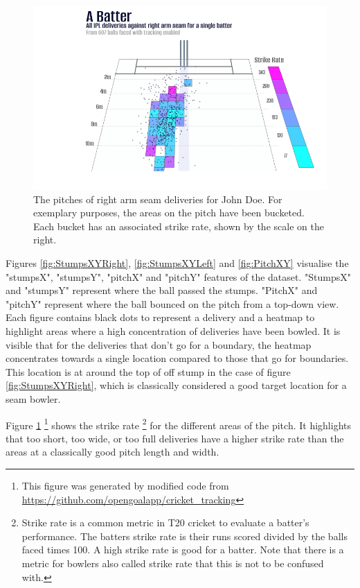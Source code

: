 \documentclass[12pt,a4paper]{report}
\theoremstyle{definition}
\begin{document}
\begin{figure}
    \centering
    \includegraphics[width=\linewidth]{right_arm_seam_pitch_strike_rate.png}
    \caption{The pitches of right arm seam deliveries for John Doe. For exemplary purposes, the areas on the pitch have been bucketed. Each bucket has an associated strike rate, shown by the scale on the right.}
    \label{fig:PitchXYStrikeRate}
\end{figure}

Figures \ref{fig:StumpsXYRight}, \ref{fig:StumpsXYLeft} and \ref{fig:PitchXY} visualise the "stumpsX", "stumpsY", "pitchX" and "pitchY" features of the dataset. 
"StumpsX" and "stumpsY" represent where the ball passed the stumps.
"PitchX" and "pitchY" represent where the ball bounced on the pitch from a top-down view.
Each figure contains black dots to represent a delivery and a heatmap to highlight areas where a high concentration of deliveries have been bowled.
It is visible that for the deliveries that don't go for a boundary, the heatmap concentrates towards a single location compared to those that go for boundaries.
This location is at around the top of off stump in the case of figure \ref{fig:StumpsXYRight}, which is classically considered a good target location for a seam bowler.

Figure \ref{fig:PitchXYStrikeRate} \footnote{This figure was generated by modified code from \url{https://github.com/opengoalapp/cricket\_tracking}} shows the strike rate \footnote{Strike rate is a common metric in T20 cricket to evaluate a batter's performance. The batters strike rate is their runs scored divided by the balls faced times 100. A high strike rate is good for a batter. Note that there is a metric for bowlers also called strike rate that this is not to be confused with.} for the different areas of the pitch. 
It highlights that too short, too wide, or too full deliveries have a higher strike rate than the areas at a classically good pitch length and width.
\end{document}
